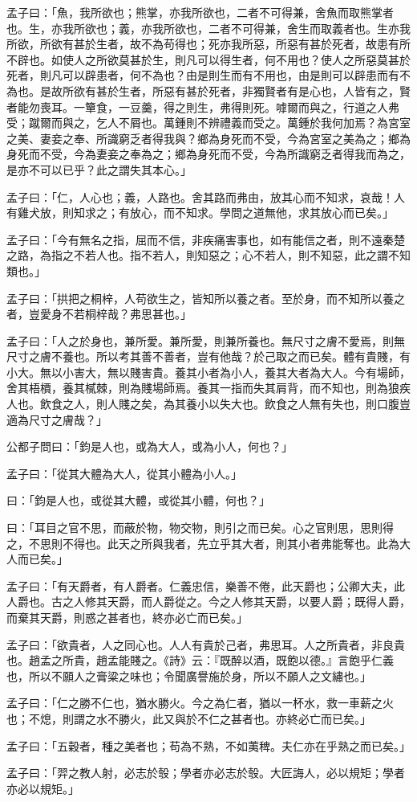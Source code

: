 \begin{pinyinscope}
孟子曰：「魚，我所欲也；熊掌，亦我所欲也，二者不可得兼，舍魚而取熊掌者也。生，亦我所欲也；義，亦我所欲也，二者不可得兼，舍生而取義者也。生亦我所欲，所欲有甚於生者，故不為苟得也；死亦我所惡，所惡有甚於死者，故患有所不辟也。如使人之所欲莫甚於生，則凡可以得生者，何不用也？使人之所惡莫甚於死者，則凡可以辟患者，何不為也？由是則生而有不用也，由是則可以辟患而有不為也。是故所欲有甚於生者，所惡有甚於死者，非獨賢者有是心也，人皆有之，賢者能勿喪耳。一簞食，一豆羹，得之則生，弗得則死。嘑爾而與之，行道之人弗受；蹴爾而與之，乞人不屑也。萬鍾則不辨禮義而受之。萬鍾於我何加焉？為宮室之美、妻妾之奉、所識窮乏者得我與？鄉為身死而不受，今為宮室之美為之；鄉為身死而不受，今為妻妾之奉為之；鄉為身死而不受，今為所識窮乏者得我而為之，是亦不可以已乎？此之謂失其本心。」

孟子曰：「仁，人心也；義，人路也。舍其路而弗由，放其心而不知求，哀哉！人有雞犬放，則知求之；有放心，而不知求。學問之道無他，求其放心而已矣。」

孟子曰：「今有無名之指，屈而不信，非疾痛害事也，如有能信之者，則不遠秦楚之路，為指之不若人也。指不若人，則知惡之；心不若人，則不知惡，此之謂不知類也。」

孟子曰：「拱把之桐梓，人苟欲生之，皆知所以養之者。至於身，而不知所以養之者，豈愛身不若桐梓哉？弗思甚也。」

孟子曰：「人之於身也，兼所愛。兼所愛，則兼所養也。無尺寸之膚不愛焉，則無尺寸之膚不養也。所以考其善不善者，豈有他哉？於己取之而已矣。體有貴賤，有小大。無以小害大，無以賤害貴。養其小者為小人，養其大者為大人。今有場師，舍其梧檟，養其樲棘，則為賤場師焉。養其一指而失其肩背，而不知也，則為狼疾人也。飲食之人，則人賤之矣，為其養小以失大也。飲食之人無有失也，則口腹豈適為尺寸之膚哉？」

公都子問曰：「鈞是人也，或為大人，或為小人，何也？」

孟子曰：「從其大體為大人，從其小體為小人。」

曰：「鈞是人也，或從其大體，或從其小體，何也？」

曰：「耳目之官不思，而蔽於物，物交物，則引之而已矣。心之官則思，思則得之，不思則不得也。此天之所與我者，先立乎其大者，則其小者弗能奪也。此為大人而已矣。」

孟子曰：「有天爵者，有人爵者。仁義忠信，樂善不倦，此天爵也；公卿大夫，此人爵也。古之人修其天爵，而人爵從之。今之人修其天爵，以要人爵；既得人爵，而棄其天爵，則惑之甚者也，終亦必亡而已矣。」

孟子曰：「欲貴者，人之同心也。人人有貴於己者，弗思耳。人之所貴者，非良貴也。趙孟之所貴，趙孟能賤之。《詩》云：『既醉以酒，既飽以德。』言飽乎仁義也，所以不願人之膏粱之味也；令聞廣譽施於身，所以不願人之文繡也。」

孟子曰：「仁之勝不仁也，猶水勝火。今之為仁者，猶以一杯水，救一車薪之火也；不熄，則謂之水不勝火，此又與於不仁之甚者也。亦終必亡而已矣。」

孟子曰：「五穀者，種之美者也；苟為不熟，不如荑稗。夫仁亦在乎熟之而已矣。」

孟子曰：「羿之教人射，必志於彀；學者亦必志於彀。大匠誨人，必以規矩；學者亦必以規矩。」


\end{pinyinscope}